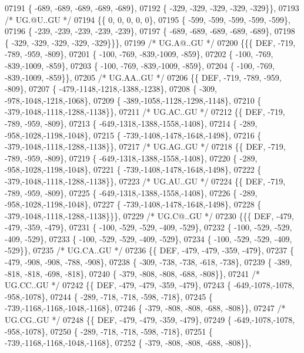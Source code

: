 \begin{DoxyCode}
07191 \{ -689, -689, -689, -689, -689\},
07192 \{ -329, -329, -329, -329, -329\}\},
07193 \textcolor{comment}{/* UG.@U..GU */}
07194 \{\{    0,    0,    0,    0,    0\},
07195 \{ -599, -599, -599, -599, -599\},
07196 \{ -239, -239, -239, -239, -239\},
07197 \{ -689, -689, -689, -689, -689\},
07198 \{ -329, -329, -329, -329, -329\}\}\},
07199 \textcolor{comment}{/* UG.A@..GU */}
07200 \{\{\{  DEF, -719, -789, -959, -809\},
07201 \{ -100, -769, -839,-1009, -859\},
07202 \{ -100, -769, -839,-1009, -859\},
07203 \{ -100, -769, -839,-1009, -859\},
07204 \{ -100, -769, -839,-1009, -859\}\},
07205 \textcolor{comment}{/* UG.AA..GU */}
07206 \{\{  DEF, -719, -789, -959, -809\},
07207 \{ -479,-1148,-1218,-1388,-1238\},
07208 \{ -309, -978,-1048,-1218,-1068\},
07209 \{ -389,-1058,-1128,-1298,-1148\},
07210 \{ -379,-1048,-1118,-1288,-1138\}\},
07211 \textcolor{comment}{/* UG.AC..GU */}
07212 \{\{  DEF, -719, -789, -959, -809\},
07213 \{ -649,-1318,-1388,-1558,-1408\},
07214 \{ -289, -958,-1028,-1198,-1048\},
07215 \{ -739,-1408,-1478,-1648,-1498\},
07216 \{ -379,-1048,-1118,-1288,-1138\}\},
07217 \textcolor{comment}{/* UG.AG..GU */}
07218 \{\{  DEF, -719, -789, -959, -809\},
07219 \{ -649,-1318,-1388,-1558,-1408\},
07220 \{ -289, -958,-1028,-1198,-1048\},
07221 \{ -739,-1408,-1478,-1648,-1498\},
07222 \{ -379,-1048,-1118,-1288,-1138\}\},
07223 \textcolor{comment}{/* UG.AU..GU */}
07224 \{\{  DEF, -719, -789, -959, -809\},
07225 \{ -649,-1318,-1388,-1558,-1408\},
07226 \{ -289, -958,-1028,-1198,-1048\},
07227 \{ -739,-1408,-1478,-1648,-1498\},
07228 \{ -379,-1048,-1118,-1288,-1138\}\}\},
07229 \textcolor{comment}{/* UG.C@..GU */}
07230 \{\{\{  DEF, -479, -479, -359, -479\},
07231 \{ -100, -529, -529, -409, -529\},
07232 \{ -100, -529, -529, -409, -529\},
07233 \{ -100, -529, -529, -409, -529\},
07234 \{ -100, -529, -529, -409, -529\}\},
07235 \textcolor{comment}{/* UG.CA..GU */}
07236 \{\{  DEF, -479, -479, -359, -479\},
07237 \{ -479, -908, -908, -788, -908\},
07238 \{ -309, -738, -738, -618, -738\},
07239 \{ -389, -818, -818, -698, -818\},
07240 \{ -379, -808, -808, -688, -808\}\},
07241 \textcolor{comment}{/* UG.CC..GU */}
07242 \{\{  DEF, -479, -479, -359, -479\},
07243 \{ -649,-1078,-1078, -958,-1078\},
07244 \{ -289, -718, -718, -598, -718\},
07245 \{ -739,-1168,-1168,-1048,-1168\},
07246 \{ -379, -808, -808, -688, -808\}\},
07247 \textcolor{comment}{/* UG.CG..GU */}
07248 \{\{  DEF, -479, -479, -359, -479\},
07249 \{ -649,-1078,-1078, -958,-1078\},
07250 \{ -289, -718, -718, -598, -718\},
07251 \{ -739,-1168,-1168,-1048,-1168\},
07252 \{ -379, -808, -808, -688, -808\}\},

\end{DoxyCode}
